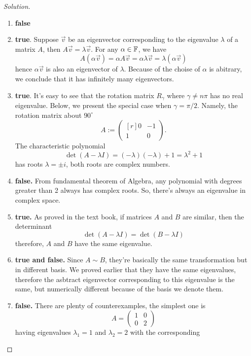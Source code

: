 \begin{proof}[Solution]
  \begin{enumerate}[label={(\alph*)}]
    \item \textbf{false}
    \item \textbf{true}. Suppose $\vec{v}$ be an eigenvector corresponding to 
      the eigenvalue $\lambda$ of a matrix $A$, then 
      $A\vec{v}=\lambda\vec{v}$. For any $\alpha\in\F$, we have
      \[
        A(\alpha\vec{v})=\alpha A\vec{v}=\alpha\lambda\vec{v}
        =\lambda (\alpha\vec{v})
      \]
      hence $\alpha\vec{v}$ is also an eigenvector of $\lambda$.
      Because of the choise of $\alpha$ is abitrary, we conclude that
      it has infinitely many eigenvectors.
    \item \textbf{true}. It's easy to see that the rotation matrix
      $R_\gamma$ where $\gamma\neq n\pi$ has no real eigenvalue. 
      Below, we present the special case when $\gamma=\pi/2$.
      Namely, the rotation matrix about $90^\circ$ 
      \[
        A:=
        \begin{pmatrix*}[r]
          0 &-1\\ 1&0
        \end{pmatrix*}.
      \]
      The characteristic polynomial 
      \[\det(A-\lambda I)=(-\lambda)(-\lambda)+1=\lambda^2+1\]
      has roots $\lambda=\pm i$, both roots are complex numbers.
    \item \textbf{false.} From fundamental theorem of Algebra,
      any polynomial with degrees greater than 2 always has
      complex roots. So, there's always an eigenvalue in complex
      space.
    \item \textbf{true.} As proved in the text book, if matrices 
      $A$ and $B$ are similar, then the determinant
      \[\det(A-\lambda I)=\det(B-\lambda I)\]
      therefore, $A$ and $B$ have the same eigenvalue.
    \item \textbf{true and false.} Since $A\sim B$, they're basically the same
      transformation but in different basis. We proved earlier that they have
      the same eigenvalues, therefore the asbtract eigenvector corresponding to 
      this eigenvalue is the same, but numerically different because of the 
      basis we denote them.
    \item \textbf{false.} There are plenty of counterexamples, the simplest one is
      \[ A= \begin{pmatrix} 1&0\\ 0&2 \end{pmatrix} \]
      having eigenvalues $\lambda_1=1$ and $\lambda_2=2$ with the corresponding

\end{enumerate}
\end{proof}
